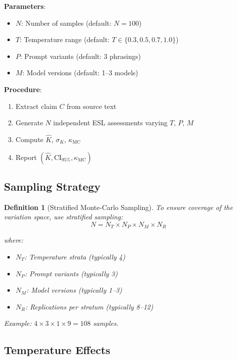 \documentclass[11pt,a4paper]{article}
\newtheorem{definition}{Definition}[section]
\theoremstyle{remark}
\begin{document}
\begin{mcbox}[title={ESL 2.1 Monte-Carlo Protocol}]
\textbf{Parameters}:
\begin{itemize}
    \item $N$: Number of samples (default: $N = 100$)
    \item $T$: Temperature range (default: $T \in \{0.3, 0.5, 0.7, 1.0\}$)
    \item $P$: Prompt variants (default: 3 phrasings)
    \item $M$: Model versions (default: 1--3 models)
\end{itemize}

\textbf{Procedure}:
\begin{enumerate}
    \item Extract claim $C$ from source text
    \item Generate $N$ independent ESL assessments varying $T$, $P$, $M$
    \item Compute $\hat{K}$, $\sigma_K$, $\kappa_{\text{MC}}$
    \item Report $(\hat{K}, \text{CI}_{95\%}, \kappa_{\text{MC}})$
\end{enumerate}
\end{mcbox}

\subsection{Sampling Strategy}

\begin{definition}[Stratified Monte-Carlo Sampling]
\label{def:stratified}
To ensure coverage of the variation space, use stratified sampling:
\begin{equation}
N = N_T \times N_P \times N_M \times N_R
\end{equation}

where:
\begin{itemize}
    \item $N_T$: Temperature strata (typically 4)
    \item $N_P$: Prompt variants (typically 3)
    \item $N_M$: Model versions (typically 1--3)
    \item $N_R$: Replications per stratum (typically 8--12)
\end{itemize}

Example: $4 \times 3 \times 1 \times 9 = 108$ samples.
\end{definition}

\subsection{Temperature Effects}
\end{document}
